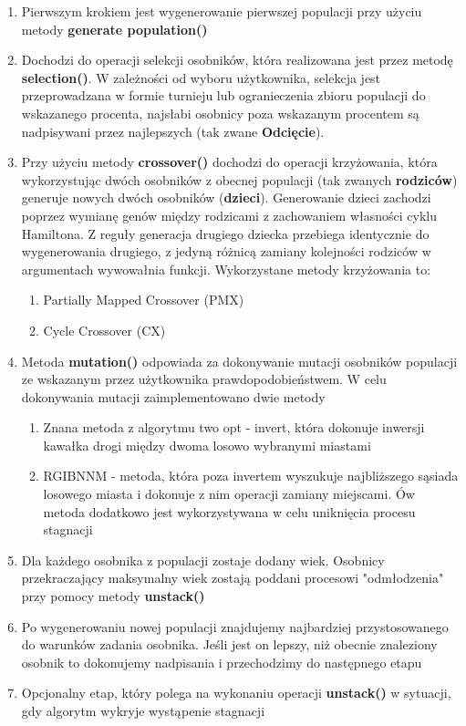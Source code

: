   \begin{enumerate}
    \item Pierwszym krokiem jest wygenerowanie pierwszej populacji przy użyciu metody \textbf{generate population()}
    \item Dochodzi do operacji selekcji osobników, która realizowana jest przez metodę \textbf{selection()}. 
    W zależności od wyboru użytkownika, selekcja jest przeprowadzana w formie turnieju lub ogranieczenia zbioru populacji do wskazanego procenta, najsłabi osobnicy poza wskazanym procentem są nadpisywani przez najlepszych (tak zwane \textbf{Odcięcie}).
    \item Przy użyciu metody \textbf{crossover()} dochodzi do operacji krzyżowania, która wykorzystując dwóch osobników z obecnej populacji (tak zwanych \textbf{rodziców}) generuje nowych dwóch osobników (\textbf{dzieci}).
    Generowanie dzieci zachodzi poprzez wymianę genów między rodzicami z zachowaniem własności cyklu Hamiltona. Z reguły generacja drugiego dziecka przebiega identycznie do wygenerowania drugiego,
    z jedyną różnicą zamiany kolejności rodziców w argumentach wywowałnia funkcji. Wykorzystane metody krzyżowania to:
    \begin{enumerate}
      \item Partially Mapped Crossover (PMX)
      \item Cycle Crossover (CX)
    \end{enumerate}
    \item Metoda \textbf{mutation()} odpowiada za dokonywanie mutacji osobników populacji ze wskazanym przez użytkownika prawdopodobieństwem.
    W celu dokonywania mutacji zaimplementowano dwie metody
    \begin{enumerate}
      \item Znana metoda z algorytmu two opt - invert, która dokonuje inwersji kawałka drogi między dwoma losowo wybranymi miastami
      \item RGIBNNM - metoda, która poza invertem wyszukuje najbliższego sąsiada losowego miasta i dokonuje z nim operacji zamiany miejscami. Ów metoda dodatkowo jest
      wykorzystywana w celu uniknięcia procesu stagnacji
    \end{enumerate}
    \item Dla każdego osobnika z populacji zostaje dodany wiek. Osobnicy przekraczający maksymalny wiek zostają poddani procesowi "odmłodzenia" przy pomocy metody \textbf{unstack()}
    \item Po wygenerowaniu nowej populacji znajdujemy najbardziej przystosowanego do warunków zadania osobnika. Jeśli jest on lepszy, niż obecnie znaleziony osobnik
    to dokonujemy nadpisania i przechodzimy do następnego etapu
    \item Opcjonalny etap, który polega na wykonaniu operacji \textbf{unstack()} w sytuacji, gdy algorytm wykryje wystąpenie stagnacji
  \end{enumerate}
